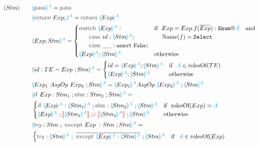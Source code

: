 \documentclass[11pt]{jarticle}
\newcommand{\projection}[2]{{\color{cyan}\llparenthesis}#1{\color{cyan}\rrparenthesis^#2}}
\newcommand{\gray}[1]{\textbf{\textsf{\color{Gray}#1}}}
\newcommand{\cyan}[1]{\color{cyan}#1}
\newcommand{\nl}[1]{{\color{red}{\llbracket}}#1{\color{red}{\rrbracket}}} %
\newcommand{\mg}{~{\color{red}{\sqcup}}~} %
\begin{document}
\begin{alignat*}{2}
  &(Stm)~~~ &&\projection{\gray{pass}}{A} = \gray{pass}\\
  &&&\projection{\gray{return} ~ Exp;}{A} = \gray{return} ~ \projection{Exp}{A}\\
  &&&\projection{Exp;Stm}{A} =
  \begin{cases}
    \gray{match} ~\projection{Exp}{A}: & \text{if}~~Exp = Exp.f(\overline{Exp}):\texttt{Enum}\gray{@}{\cyan{A}}~~~\text{and}\\
    ~~~~~\gray{case} ~id: \projection{Stm}{A}; &~~~~ \text{Name}(f) = \texttt{Select}\\%
    ~~~~~\gray{case} ~\_\_: \text{assert False}; \\
    \projection{Exp}{A};\projection{Stm}{A} & \text{otherwise}\\
  \end{cases}\\
  &&& \projection{id:TE = Exp~;Stm}{A} =
  \begin{cases}
    id = \projection{Exp}{A};\projection{Stm}{A} & \text{if}~~ {\color{cyan}A} \in \text{rolesOf}(TE)\\
    \projection{Exp}{A};\projection{Stm}{A} & \text{otherwise}
  \end{cases}\\
  &&& \projection{Exp_1 ~AsgOp~ Exp_2 ~; Stm}{A} = \projection{Exp_1}{A} AsgOp~ \projection{Exp_2}{A} ~; \projection{Stm}{A} \\
  &&&\projection{\gray{if}~Exp:Stm_1~;\gray{else}:Stm_2 ~;Stm}{A}=\\
  &&&
  \begin{cases}
    \gray{if}~\projection{Exp}{A} : \projection{Stm_1}{A} ~; \gray{else}:\projection{Stm_2}{A} ~;\projection{Stm}{A} & \text{if}~~ \text{rolesOf}(Exp) = \cyan{A}\\
    \projection{Exp}{A} ~; \nl{\projection{Stm_1}{A}} \mg \nl{\projection{Stm_2}{A}} ~;\projection{Stm}{A} & \text{otherwise}
  \end{cases}\\
  &&&\projection{\gray{try}:Stm ~;~ \gray{except}~Exp~:Stm ~;Stm}{A} =\\
  &&&
  \begin{cases}
    \gray{try}:\projection{Stm}{A}~;~\overline{\gray{except}~ \projection{Exp}{A} : \projection{Stm}{A}}~;\projection{Stm}{A} & \text{if}~~ {\cyan{A}} \in \text{rolesOf}(Exp)\\
  \end{cases}\\
\end{alignat*}
\end{document}
